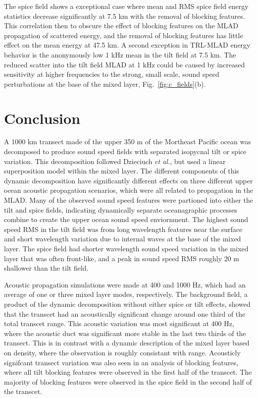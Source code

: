 \documentclass[preprint,NumberedRefs]{JASA}
\begin{document}
The spice field shows a exceptional case where mean and RMS spice field energy statistics decrease significantly at 7.5 km with the removal of blocking features. This correlation then to obscure the effect of blocking features on the MLAD propagation of scattered energy, and the removal of blocking features has little effect on the mean energy at 47.5 km. A second exception in TRL-MLAD energy behavior is the anonymously low 1 kHz mean in the tilt field at 7.5 km. The reduced scatter into the tilt field MLAD at 1 kHz could be caused by increased sensitivity at higher frequencies to the strong, small scale, sound speed perturbations at the base of the mixed layer, Fig.~\ref{fig:c_fields}(b).

\section{Conclusion}\label{sec:conclusion}
A 1000 km transect made of the upper 350 m of the Mortheast Pacific ocean was decomposed to produce sound speed fields with separated isopycnal tilt or spice variation. This decomposition followed Dzieciuch \emph{et al.}\citep{dzieciuch2004}, but used a linear superposition model within the mixed layer. The different components of this dynamic decomposition have significantly different effects on three different upper ocean acoustic propagation scenarios, which were all related to propagation in the MLAD. Many of the observed sound speed features were partioned into either the tilt and spice fields, indicating dynamically separate oceanagraphic processes combine to create the upper ocean sound speed enviornment. The highest sound speed RMS in the tilt field was from long wavelength features near the surface and short wavelength variation due to internal waves at the base of the mixed layer. The spice field had shorter wavelength sound speed variation in the mixed layer that was often front-like, and a peak in sound speed RMS roughly 20 m shallower than the tilt field.

Acoustic propagation simulations were made at 400 and 1000 Hz, which had an average of one or three mixed layer modes, respectively. The background field, a product of the dynamic decomposition without either spice or tilt effects, showed that the transcet had an acoustically significant change around one third of the total transcet range. This acoustic variation was most significant at 400 Hz, where the acoustic duct was significant more stable in the last two thirds of the transect. This is in contrast with a dynamic description of the mixed layer based on density\citep{cole2010seasonal}, where the observation is roughly consistant with range. Acousticly signifcant transect variation was also seen in an analysis of blocking features, where all tilt blocking features were observed in the first half of the transcet. The majority of blocking features were observed in the spice field in the second half of the transcet.
\end{document}
